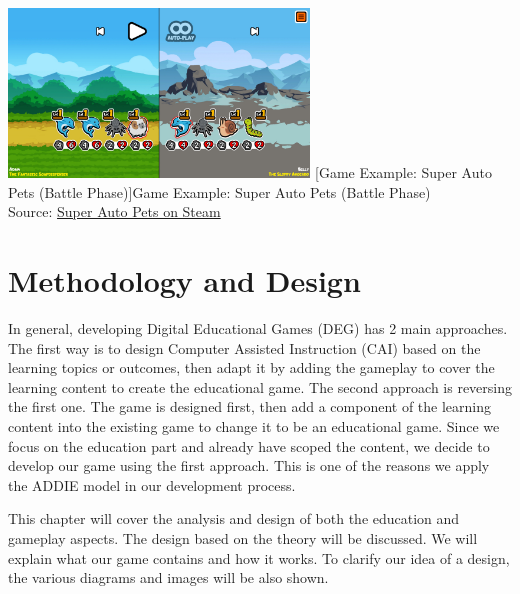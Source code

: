 \documentclass[12pt,oneside,openright,a4paper]{cpe-english-project}
\begin{document}
\begin{enumerate}
\begin{minipage}[c]{\textwidth}
	\label{fig:related-work-sap1}
	\end{minipage}
	\begin{minipage}[c]{\textwidth}\centering
	\includegraphics[width=8cm]{figure/related-work-sap2.png}
	[Game Example: Super Auto Pets (Battle Phase)]{Game Example: Super Auto Pets (Battle Phase) 
		\\ Source: \href{https://store.steampowered.com/app/1714040/Super_Auto_Pets/}{Super Auto Pets on Steam}}
	\label{fig:related-work-sap2}
	\end{minipage}
\end{enumerate}



\chapter{Methodology and Design}
\hspace{2em}In general, developing Digital Educational Games (DEG) has 2 main approaches. The first way is to design Computer Assisted Instruction (CAI) based on the learning topics or outcomes, then adapt it by adding the gameplay to cover the learning content to create the educational game. The second approach is reversing the first one. The game is designed first, then add a component of the learning content into the existing game to change it to be an educational game. Since we focus on the education part and already have scoped the content, we decide to develop our game using the first approach. This is one of the reasons we apply the ADDIE model in our development process.

\hspace{2em}This chapter will cover the analysis and design of both the education and gameplay aspects. The design based on the theory will be discussed. We will explain what our game contains and how it works. To clarify our idea of a design, the various diagrams and images will be also shown.
\end{document}
